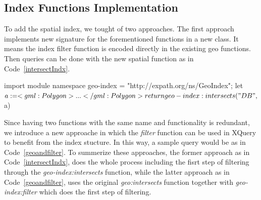 \documentclass[a4paper,12pt]{article}
\begin{document}
\subsection{Index Functions Implementation}
\label{indexFunc}
To add the spatial index, we tought of two approaches. The first approach implements new signature for the forementioned functions in a new class. It means the index filter function is encoded directly in the existing geo functions. Then queries can be done with the new spatial function as in Code~\ref{intersectIndx}.
\vspace{10px}
\begin{fakeXML}[label=intersectIndx,caption=The geo function containing the index functions]
import module namespace geo-index = "http://expath.org/ns/GeoIndex";
let $a:= <gml:Polygon> ... </gml:Polygon>
return geo-index:intersects("DB", $a) 
\end{fakeXML}

\vspace{10px}
\vspace{10px}

Since having two functions with the same name and functionality is redundant, we introduce a new approache in which the \textit{filter} function can be used in XQuery to benefit from the index stucture. In this way, a sample query would be as in Code~\ref{geoandfilter}. To summerize these approaches, the former approach as in Code~\ref{intersectIndx}, does the whole process including the fisrt step of filtering through the \textit{geo-index:intersects} function, while the latter approach as in Code~\ref{geoandfilter}, uses the original \textit{geo:intersects} function together with \textit{geo-index:filter} which does the first step of filtering. 
\end{document}
